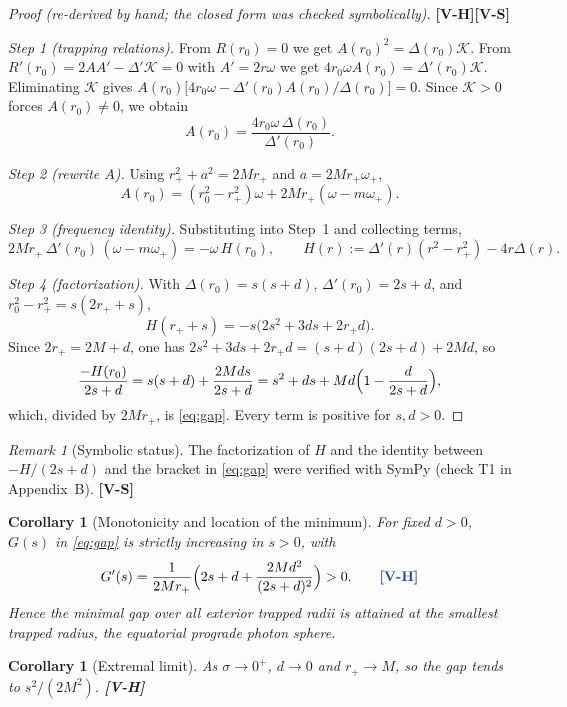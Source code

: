 \documentclass[11pt, a4paper]{article}
\newcommand{\VS}{\textcolor{vs}{\textbf{[V-S]}}}
\newcommand{\VH}{\textcolor{vh}{\textbf{[V-H]}}}
\newtheorem{corollary}[theorem]{Corollary}
\theoremstyle{remark}
\newtheorem{remark}[theorem]{Remark}
\theoremstyle{definition}
\begin{document}
\begin{proof}[Proof (re-derived by hand; the closed form was checked symbolically)]
\VH\VS

\emph{Step 1 (trapping relations).} From $R(r_0) = 0$ we get $A(r_0)^2 = \Delta(r_0)\mathcal{K}$. From $R'(r_0) = 2A A' - \Delta'\mathcal{K} = 0$ with $A' = 2r\omega$ we get $4r_0\omega A(r_0) = \Delta'(r_0)\mathcal{K}$. Eliminating $\mathcal{K}$ gives $A(r_0)\bigl[4r_0\omega - \Delta'(r_0)A(r_0)/\Delta(r_0)\bigr] = 0$. Since $\mathcal{K} > 0$ forces $A(r_0)\ne 0$, we obtain
\[
A(r_0) = \frac{4r_0\omega\,\Delta(r_0)}{\Delta'(r_0)}.
\]

\emph{Step 2 (rewrite $A$).} Using $r_+^2 + a^2 = 2Mr_+$ and $a = 2Mr_+\omega_+$,
\[
A(r_0) = (r_0^2 - r_+^2)\omega + 2Mr_+(\omega - m\omega_+).
\]

\emph{Step 3 (frequency identity).} Substituting into Step~1 and collecting terms,
\[
2Mr_+\,\Delta'(r_0)\,(\omega - m\omega_+) = -\omega\,H(r_0), \qquad H(r) := \Delta'(r)(r^2 - r_+^2) - 4r\Delta(r).
\]

\emph{Step 4 (factorization).} With $\Delta(r_0) = s(s+d)$, $\Delta'(r_0) = 2s+d$, and $r_0^2 - r_+^2 = s(2r_++s)$,
\[
H(r_+ + s) = -s\bigl(2s^2 + 3ds + 2r_+ d\bigr).
\]
Since $2r_+ = 2M + d$, one has $2s^2+3ds+2r_+d = (s+d)(2s+d) + 2Md$, so
\[
\frac{-H(r_0)}{2s+d} = s(s+d) + \frac{2Mds}{2s+d} = s^2 + ds + Md\Bigl(1 - \frac{d}{2s+d}\Bigr),
\]
which, divided by $2Mr_+$, is \eqref{eq:gap}. Every term is positive for $s,d>0$. \qedhere
\end{proof}

\begin{remark}[Symbolic status]
The factorization of $H$ and the identity between $-H/(2s+d)$ and the bracket in \eqref{eq:gap} were verified with SymPy (check T1 in Appendix~B). \VS
\end{remark}

\begin{corollary}[Monotonicity and location of the minimum]
\label{cor:mono}
For fixed $d>0$, $G(s)$ in \eqref{eq:gap} is strictly increasing in $s>0$, with
\[
G'(s) = \frac{1}{2Mr_+}\Bigl(2s + d + \frac{2Md^2}{(2s+d)^2}\Bigr) > 0. \tag*{\VH}
\]
Hence the minimal gap over all exterior trapped radii is attained at the smallest trapped radius, the equatorial prograde photon sphere.
\end{corollary}

\begin{corollary}[Extremal limit]
As $\sigma \to 0^+$, $d \to 0$ and $r_+ \to M$, so the gap tends to $s^2/(2M^2)$. \VH
\end{corollary}
\end{document}
